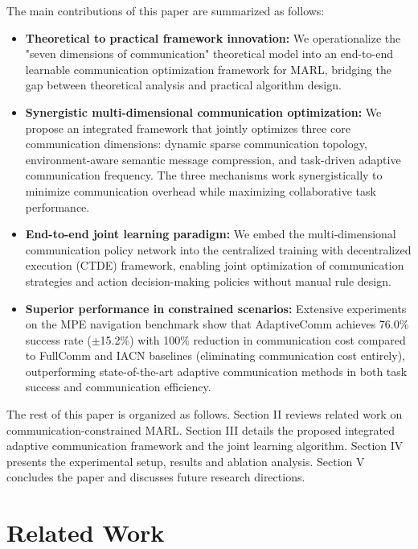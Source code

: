 \documentclass[10pt, twocolumn]{IEEEtran}
\begin{document}
The main contributions of this paper are summarized as follows:
\begin{itemize}
    \item \textbf{Theoretical to practical framework innovation:} We operationalize the "seven dimensions of communication" theoretical model into an end-to-end learnable communication optimization framework for MARL, bridging the gap between theoretical analysis and practical algorithm design.
    
    \item \textbf{Synergistic multi-dimensional communication optimization:} We propose an integrated framework that jointly optimizes three core communication dimensions: dynamic sparse communication topology, environment-aware semantic message compression, and task-driven adaptive communication frequency. The three mechanisms work synergistically to minimize communication overhead while maximizing collaborative task performance.
    
    \item \textbf{End-to-end joint learning paradigm:} We embed the multi-dimensional communication policy network into the centralized training with decentralized execution (CTDE) framework, enabling joint optimization of communication strategies and action decision-making policies without manual rule design.
    
    \item \textbf{Superior performance in constrained scenarios:} Extensive experiments on the MPE navigation benchmark show that AdaptiveComm achieves 76.0\% success rate ($\pm$15.2\%) with 100\% reduction in communication cost compared to FullComm and IACN baselines (eliminating communication cost entirely), outperforming state-of-the-art adaptive communication methods in both task success and communication efficiency.
\end{itemize}

The rest of this paper is organized as follows. Section II reviews related work on communication-constrained MARL. Section III details the proposed integrated adaptive communication framework and the joint learning algorithm. Section IV presents the experimental setup, results and ablation analysis. Section V concludes the paper and discusses future research directions.

\section{Related Work}
\end{document}
